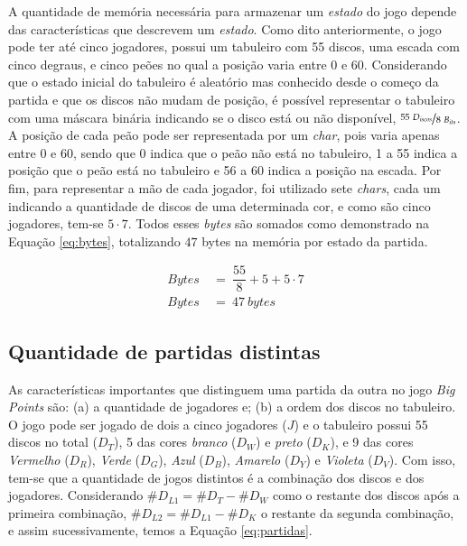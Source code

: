 A quantidade de memória necessária para armazenar um \emph{estado} do jogo depende das características que descrevem um \emph{estado}. Como dito anteriormente, o jogo pode ter até cinco jogadores, possui um tabuleiro com 55 discos, uma escada com cinco degraus, e cinco peões no qual a posição varia entre 0 e 60. Considerando que o estado inicial do tabuleiro é aleatório mas conhecido desde o começo da partida e que os discos não mudam de posição, é possível representar o tabuleiro com uma máscara binária indicando se o disco está ou não disponível, $\nicefrac{55\ D_{iscos}}{8\ B_{its}}$. A posição de cada peão pode ser representada por um \emph{char}, pois varia apenas entre 0 e 60, sendo que 0 indica que o peão não está no tabuleiro, 1 a 55 indica a posição que o peão está no tabuleiro e 56 a 60 indica a posição na escada. Por fim, para representar a mão de cada jogador, foi utilizado sete \emph{chars}, cada um indicando a quantidade de discos de uma determinada cor, e como são cinco jogadores, tem-se $5\cdot 7$. Todos esses \emph{bytes} são somados como demonstrado na Equação \ref{eq:bytes}, totalizando $47$ bytes na memória por estado da partida.

\begin{equation} \label{eq:bytes} \tag{e.q. Bytes na memória}
\begin{split}
Bytes\ &=\ \dfrac{55}{8} + 5 + 5\cdot 7\\
Bytes\ &=\ 47\ bytes
\end{split}
\end{equation}

\subsection{Quantidade de partidas distintas}
As características importantes que distinguem uma partida da outra no jogo \emph{Big Points} são: (a) a quantidade de jogadores e; (b) a ordem dos discos no tabuleiro. O jogo pode ser jogado de dois a cinco jogadores ($J$) e o tabuleiro possui 55 discos no total ($D_T$), 5 das cores \emph{branco} ($D_W$) e \emph{preto} ($D_K$), e 9 das cores \emph{Vermelho} ($D_R$), \emph{Verde} ($D_G$), \emph{Azul} ($D_B$), \emph{Amarelo} ($D_Y$) e \emph{Violeta} ($D_V$). Com isso, tem-se que a quantidade de jogos distintos é a combinação dos discos e dos jogadores. Considerando $\#D_{L1} = \#D_T - \#D_W$ como o restante dos discos após a primeira combinação, $\#D_{L2} = \#D_{L1} - \#D_K$ o restante da segunda combinação, e assim sucessivamente, temos a Equação \ref{eq:partidas}.

